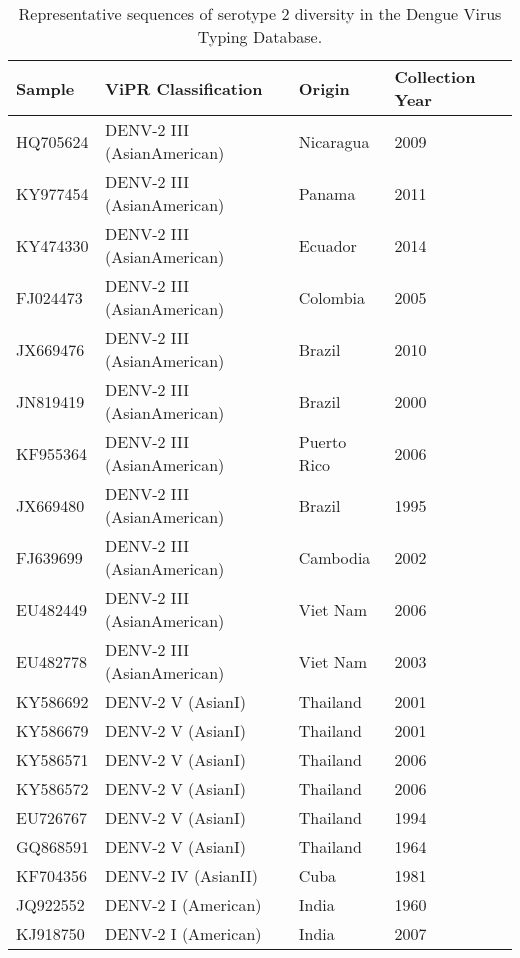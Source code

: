\begin{longtable}{@{}llll@{}}
\caption{Representative sequences of serotype 2 diversity in the Dengue Virus Typing Database.}
\label{tab:chap4_s8}\\ \toprule
Sample   & ViPR Classification        & Origin       & Collection Year \\ \midrule
HQ705624 & DENV-2 III (AsianAmerican) & Nicaragua    & 2009            \\
KY977454 & DENV-2 III (AsianAmerican) & Panama       & 2011            \\
KY474330 & DENV-2 III (AsianAmerican) & Ecuador      & 2014            \\
FJ024473 & DENV-2 III (AsianAmerican) & Colombia     & 2005            \\
JX669476 & DENV-2 III (AsianAmerican) & Brazil       & 2010            \\
JN819419 & DENV-2 III (AsianAmerican) & Brazil       & 2000            \\
KF955364 & DENV-2 III (AsianAmerican) & Puerto Rico  & 2006            \\
JX669480 & DENV-2 III (AsianAmerican) & Brazil       & 1995            \\
FJ639699 & DENV-2 III (AsianAmerican) & Cambodia     & 2002            \\
EU482449 & DENV-2 III (AsianAmerican) & Viet Nam     & 2006            \\
EU482778 & DENV-2 III (AsianAmerican) & Viet Nam     & 2003            \\
KY586692 & DENV-2 V (AsianI)          & Thailand     & 2001            \\
KY586679 & DENV-2 V (AsianI)          & Thailand     & 2001            \\
KY586571 & DENV-2 V (AsianI)          & Thailand     & 2006            \\
KY586572 & DENV-2 V (AsianI)          & Thailand     & 2006            \\
EU726767 & DENV-2 V (AsianI)          & Thailand     & 1994            \\
GQ868591 & DENV-2 V (AsianI)          & Thailand     & 1964            \\
KF704356 & DENV-2 IV (AsianII)        & Cuba         & 1981            \\
JQ922552 & DENV-2 I (American)        & India        & 1960            \\
KJ918750 & DENV-2 I (American)        & India        & 2007            \\

\end{longtable}
